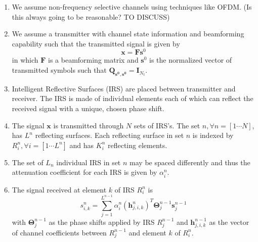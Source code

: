 \documentclass[12pt,a4paper]{report}
\begin{document}
\begin{enumerate}
\item 
	We assume non-frequency selective channels using techniques like OFDM. (Is this always going to be reasonable? TO DISCUSS)
	
\item 
	We assume a transmitter with channel state information and beamforming capability such that the transmitted signal is given by 
	\begin{equation}
	\mathbf{x} = \mathbf{F}\mathbf{s}^0
	\end{equation}
	in  which $\mathbf{F}$ is a beamforming matrix and $\mathbf{s}^0$ is the normalized vector of transmitted symbols such that $\mathbf{Q_{\mathbf{s}^0,\mathbf{s}^0}} = \mathbf{I}_{N_t}$. 
	
\item Intelligent Reflective Surfaces (IRS) are placed between transmitter and receiver. The IRS is made of individual elements each of which can reflect the received signal with a unique, chosen phase shift.


\item 
The signal $\mathbf{x}$ is transmitted through $N$ sets of IRS's. The set $n, \forall n = [1 \cdots N]$, has $L^n$ reflecting surfaces. Each reflecting surface in set $n$ is indexed by $R^n_{i}, \forall i = [1\cdots L^n]$ and has $K_{i}^{n}$ reflecting elements.
\item
The set of $L_n$ individual IRS in set $n$ may be spaced differently and thus the attenuation coefficient for each IRS is given by $\alpha_i^n$.
\item 
 The  signal received at element $k$ of IRS $R_i^n$ is 
\begin{equation}
s^{n}_{i,k} = \sum_{j = 1}^{L^{n-1}} \alpha_i^n (\mathbf{h}^{n}_{j,i,k})^T \boldsymbol{\Theta}^{n-1}_{j}\mathbf{s}^{n-1}_{j}
\end{equation}
with $\boldsymbol{\Theta}^{n-1}_{j}$ as the phase shifts applied by IRS $R_j^{n-1}$ and $\mathbf{h}^{n-1}_{j,i,k}$ as the vector of channel coefficients between $R_j^{n-1}$ and element $k$ of $R_i^n$.


\end{enumerate}
\end{document}
